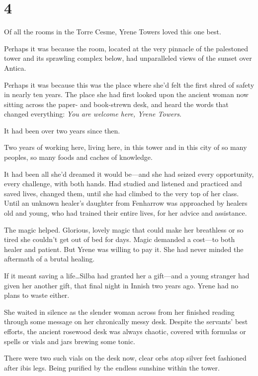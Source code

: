 
\chapter{4}

Of all the rooms in the Torre Cesme, Yrene Towers loved this one best.

Perhaps it was because the room, located at the very pinnacle of the palestoned tower and its sprawling complex below, had unparalleled views of the sunset over Antica.

Perhaps it was because this was the place where she'd felt the first shred of safety in nearly ten years. The place she had first looked upon the ancient woman now sitting across the paper- and book-strewn desk, and heard the words that changed everything: \emph{You are welcome here, Yrene Towers}.

It had been over two years since then.

Two years of working here, living here, in this tower and in this city of so many peoples, so many foods and caches of knowledge.

It had been all she'd dreamed it would be---and she had seized every opportunity, every challenge, with both hands. Had studied and listened and practiced and saved lives, changed them, until she had climbed to the very top of her class. Until an unknown healer's daughter from Fenharrow was approached by healers old and young, who had trained their entire lives, for her advice and assistance.

The magic helped. Glorious, lovely magic that could make her breathless or so tired she couldn't get out of bed for days. Magic demanded a cost---to both healer and patient. But Yrene was willing to pay it. She had never minded the aftermath of a brutal healing.

If it meant saving a life\ldots Silba had granted her a gift---and a young stranger had given her another gift, that final night in Innish two years ago. Yrene had no plans to waste either.

She waited in silence as the slender woman across from her finished reading through some message on her chronically messy desk. Despite the servants' best efforts, the ancient rosewood desk was always chaotic, covered with formulas or spells or vials and jars brewing some tonic.

There were two such vials on the desk now, clear orbs atop silver feet fashioned after ibis legs. Being purified by the endless sunshine within the tower.

